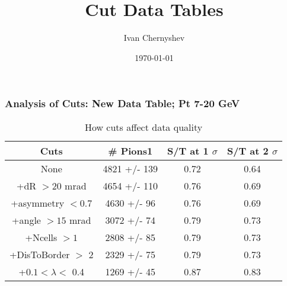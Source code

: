 \documentclass{beamer}
\title{Cut Data Tables}
\author{Ivan Chernyshev}
\date{\today}
\begin{document}

\frame
{
\frametitle{Analysis of Cuts: New Data Table;  Pt 7-20 GeV}
\begin{table}
\caption{How cuts affect data quality}
\centering
\begin{tabular}{c c c c}
\hline\hline
Cuts & \# Pions1 & S/T at 1 $\sigma$ &  S/T at 2 $\sigma$ \\ [0.5ex] %
\hline %
None & 4821 +/- 139 & 0.72 & 0.64 \\ %
+dR $> 20$ mrad & 4654 +/- 110 & 0.76 & 0.69 \\ %
+asymmetry $< 0.7$ & 4630 +/- 96 & 0.76 & 0.69 \\ %
+angle $> 15$ mrad & 3072 +/- 74 & 0.79 & 0.73 \\ %
+Ncells $> 1$& 2808 +/- 85 & 0.79 & 0.73\\ %
+DisToBorder $>$ 2 & 2329 +/- 75 & 0.79 & 0.73 \\ %
+$0.1 < \lambda <$ 0.4 & 1269 +/- 45 & 0.87 & 0.83 \\  %
[1ex]
\hline
\end{tabular}
\label{table:nonlin}
\end{table}
}
\end{document}
